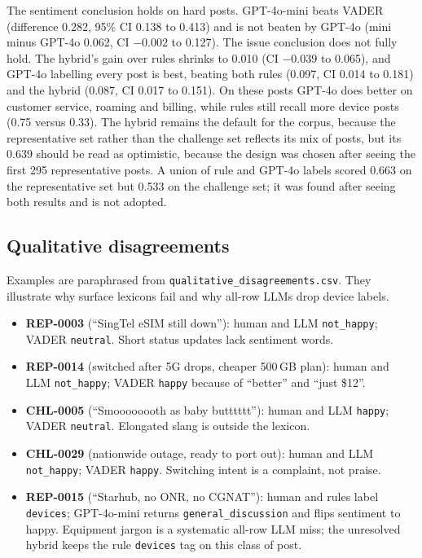\documentclass[11pt,a4paper]{article}
\begin{document}
The sentiment conclusion holds on hard posts. GPT-4o-mini beats VADER (difference 0.282, 95\% CI 0.138 to 0.413) and is not beaten by GPT-4o (mini minus GPT-4o 0.062, CI $-0.002$ to 0.127). The issue conclusion does not fully hold. The hybrid's gain over rules shrinks to 0.010 (CI $-0.039$ to 0.065), and GPT-4o labelling every post is best, beating both rules (0.097, CI 0.014 to 0.181) and the hybrid (0.087, CI 0.017 to 0.151). On these posts GPT-4o does better on customer service, roaming and billing, while rules still recall more device posts (0.75 versus 0.33). The hybrid remains the default for the corpus, because the representative set rather than the challenge set reflects its mix of posts, but its 0.639 should be read as optimistic, because the design was chosen after seeing the first 295 representative posts. A union of rule and GPT-4o labels scored 0.663 on the representative set but 0.533 on the challenge set; it was found after seeing both results and is not adopted.

\subsection{Qualitative disagreements}

Examples are paraphrased from \texttt{qualitative\_disagreements.csv}. They illustrate why surface lexicons fail and why all-row LLMs drop device labels.

\begin{itemize}
  \item \textbf{REP-0003} (``SingTel eSIM still down''): human and LLM \texttt{not\_happy}; VADER \texttt{neutral}. Short status updates lack sentiment words.
  \item \textbf{REP-0014} (switched after 5G drops, cheaper 500\,GB plan): human and LLM \texttt{not\_happy}; VADER \texttt{happy} because of ``better'' and ``just \$12''.
  \item \textbf{CHL-0005} (``Smoooooooth as baby butttttt''): human and LLM \texttt{happy}; VADER \texttt{neutral}. Elongated slang is outside the lexicon.
  \item \textbf{CHL-0029} (nationwide outage, ready to port out): human and LLM \texttt{not\_happy}; VADER \texttt{happy}. Switching intent is a complaint, not praise.
  \item \textbf{REP-0015} (``Starhub, no ONR, no CGNAT''): human and rules label \texttt{devices}; GPT-4o-mini returns \texttt{general\_discussion} and flips sentiment to happy. Equipment jargon is a systematic all-row LLM miss; the unresolved hybrid keeps the rule \texttt{devices} tag on this class of post.
\end{itemize}
\end{document}
